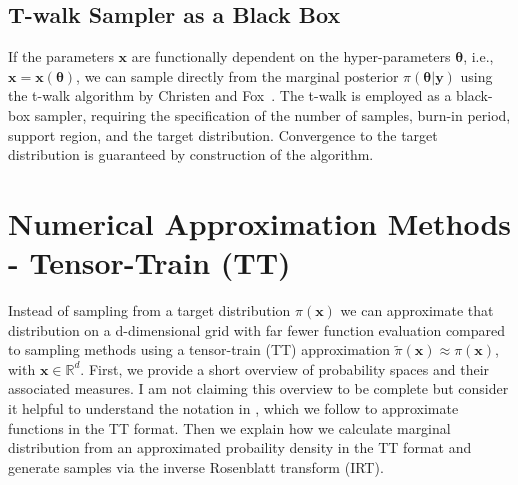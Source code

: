 \subsection{T-walk Sampler as a Black Box}
If the parameters $\bm{x}$ are functionally dependent on the hyper-parameters $\bm{\theta}$, i.e., $\bm{x} = \bm{x}(\bm{\theta})$, we can sample directly from the marginal posterior $\pi(\bm{\theta} | \bm{y})$ using the t-walk algorithm by Christen and Fox~\cite{christen2010general}. 
The t-walk is employed as a black-box sampler, requiring the specification of the number of samples, burn-in period, support region, and the target distribution. 
Convergence to the target distribution is guaranteed by construction of the algorithm.

\section{Numerical Approximation Methods - Tensor-Train (TT)}
\label{sec:tensortrain}
Instead of sampling from a target distribution $\pi(\bm{x})$ we can approximate that distribution on a d-dimensional grid with far fewer function evaluation compared to sampling methods using a tensor-train (TT) approximation $\tilde{\pi}(\bm{x}) \approx \pi(\bm{x})$, with  $\bm{x}\in \mathbb{R}^d$.
First, we provide a short overview of probability spaces and their associated measures. 
I am not claiming this overview to be complete but consider it helpful to understand the notation in \cite{cui2022deep}, which we follow to approximate functions in the TT format.
Then we explain how we calculate marginal distribution from an approximated probaility density in the TT format and generate samples via the inverse Rosenblatt transform (IRT).


